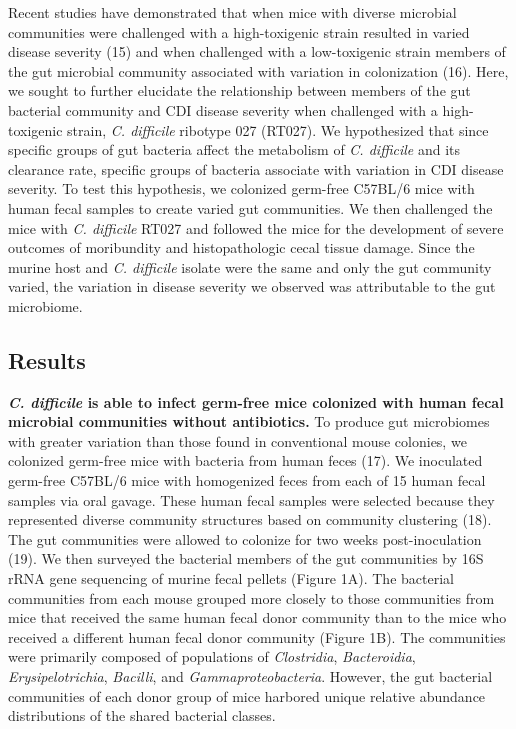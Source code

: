 \documentclass[
  12pt,
]{article}
\begin{document}
Recent studies have demonstrated that when mice with diverse microbial
communities were challenged with a high-toxigenic strain resulted in
varied disease severity (15) and when challenged with a low-toxigenic
strain members of the gut microbial community associated with variation
in colonization (16). Here, we sought to further elucidate the
relationship between members of the gut bacterial community and CDI
disease severity when challenged with a high-toxigenic strain, \emph{C.
difficile} ribotype 027 (RT027). We hypothesized that since specific
groups of gut bacteria affect the metabolism of \emph{C. difficile} and
its clearance rate, specific groups of bacteria associate with variation
in CDI disease severity. To test this hypothesis, we colonized germ-free
C57BL/6 mice with human fecal samples to create varied gut communities.
We then challenged the mice with \emph{C. difficile} RT027 and followed
the mice for the development of severe outcomes of moribundity and
histopathologic cecal tissue damage. Since the murine host and \emph{C.
difficile} isolate were the same and only the gut community varied, the
variation in disease severity we observed was attributable to the gut
microbiome.

\hypertarget{results}{%
\subsection{Results}\label{results}}

\textbf{\emph{C. difficile} is able to infect germ-free mice colonized
with human fecal microbial communities without antibiotics.} To produce
gut microbiomes with greater variation than those found in conventional
mouse colonies, we colonized germ-free mice with bacteria from human
feces (17). We inoculated germ-free C57BL/6 mice with homogenized feces
from each of 15 human fecal samples via oral gavage. These human fecal
samples were selected because they represented diverse community
structures based on community clustering (18). The gut communities were
allowed to colonize for two weeks post-inoculation (19). We then
surveyed the bacterial members of the gut communities by 16S rRNA gene
sequencing of murine fecal pellets (Figure 1A). The bacterial
communities from each mouse grouped more closely to those communities
from mice that received the same human fecal donor community than to the
mice who received a different human fecal donor community (Figure 1B).
The communities were primarily composed of populations of
\emph{Clostridia}, \emph{Bacteroidia}, \emph{Erysipelotrichia},
\emph{Bacilli}, and \emph{Gammaproteobacteria}. However, the gut
bacterial communities of each donor group of mice harbored unique
relative abundance distributions of the shared bacterial classes.
\end{document}
